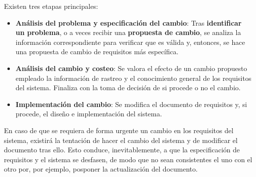 Existen tres etapas principales:

\begin{itemize}
    \item \textbf{Análisis del problema y especificación del cambio}: Tras \textbf{identificar un problema}, o a veces recibir una \textbf{propuesta de cambio}, se analiza la información correspondiente para verificar que es válida y, entonces, se hace una propuesta de cambio de requisitos más específica.
    \item \textbf{Análisis del cambio y costeo}: Se valora el efecto de un cambio propuesto empleado la información de rastreo y el conocimiento general de los requisitos del sistema. Finaliza con la toma de decisión de si procede o no el cambio.
    \item \textbf{Implementación del cambio}: Se modifica el documento de requisitos y, si procede, el diseño e implementación del sistema.
\end{itemize}

En caso de que se requiera de forma urgente un cambio en los requisitos del sistema, existirá la tentación de hacer el cambio del sistema y de modificar el documento tras ello. Esto conduce, inevitablemente, a que la especificación de requisitos y el sistema se desfasen, de modo que no sean consistentes el uno con el otro por, por ejemplo, posponer la actualización del documento.
